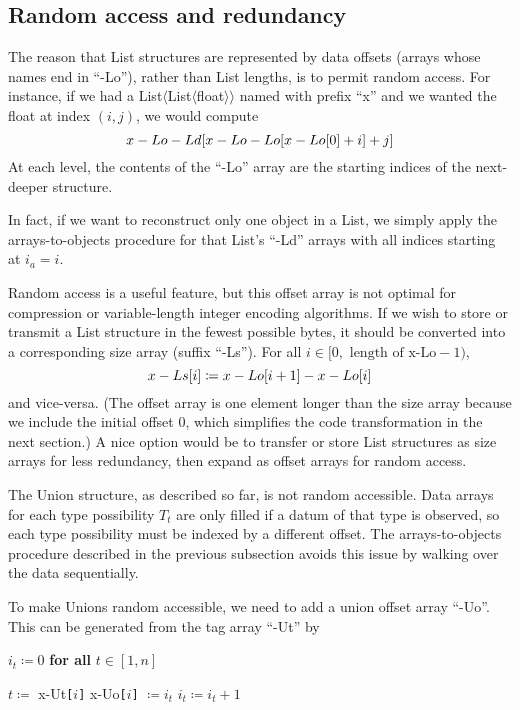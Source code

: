\documentclass[10pt, conference, compsocconf]{IEEEtran}
\begin{document}
\subsection{Random access and redundancy}

The reason that List structures are represented by data offsets (arrays whose names end in ``-Lo''), rather than List lengths, is to permit random access. For instance, if we had a List$\langle$List$\langle$float$\rangle\rangle$ named with prefix ``x'' and we wanted the float at index $(i, j)$, we would compute
\[ \mbox{x-Lo-Ld{\tt [}x-Lo-Lo{\tt [}x-Lo{\tt [}} 0 \mbox{\tt ]} + i \mbox{\tt ]} + j \mbox{\tt ]} \]
At each level, the contents of the ``-Lo'' array are the starting indices of the next-deeper structure.

In fact, if we want to reconstruct only one object in a List, we simply apply the arrays-to-objects procedure for that List's ``-Ld'' arrays with all indices starting at $i_a = i$.

Random access is a useful feature, but this offset array is not optimal for compression or variable-length integer encoding algorithms. If we wish to store or transmit a List structure in the fewest possible bytes, it should be converted into a corresponding size array (suffix ``-Ls''). For all $i \in [0, \mbox{ length of x-Lo} - 1)$,
\[ \mbox{x-Ls{\tt [}} i \mbox{\tt ]} \coloneqq \mbox{x-Lo{\tt [}} i + 1 \mbox{\tt ]} - \mbox{x-Lo{\tt [}} i \mbox{\tt ]} \]
and vice-versa. (The offset array is one element longer than the size array because we include the initial offset 0, which simplifies the code transformation in the next section.) A nice option would be to transfer or store List structures as size arrays for less redundancy, then expand as offset arrays for random access.

The Union structure, as described so far, is not random accessible. Data arrays for each type possibility $T_t$ are only filled if a datum of that type is observed, so each type possibility must be indexed by a different offset. The arrays-to-objects procedure described in the previous subsection avoids this issue by walking over the data sequentially.

To make Unions random accessible, we need to add a union offset array ``-Uo''. This can be generated from the tag array ``-Ut'' by
\begin{algorithmic}
\vspace{0.15 cm}
\STATE $i_t \coloneqq 0$ {\bf for all} $t \in [1, n]$

\vspace{0.15 cm}
\STATE $t \coloneqq$ \mbox{x-Ut}{\tt [}$i${\tt ]}
\STATE \mbox{x-Uo}{\tt [}$i${\tt ]} $\coloneqq i_t$
\STATE $i_t \coloneqq i_t + 1$
\ENDFOR
\end{algorithmic}
\end{document}
